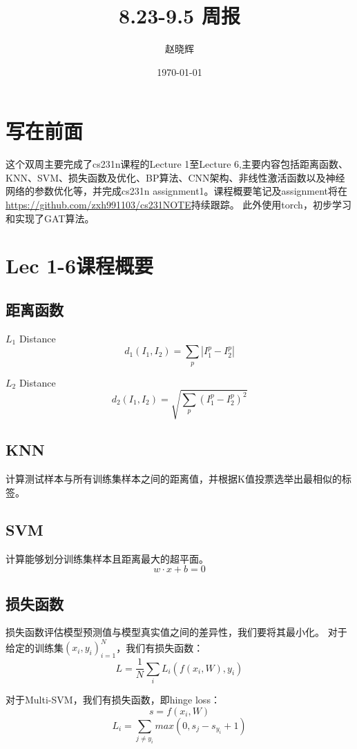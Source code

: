 \documentclass[a4paper]{article}
\title{8.23-9.5 周报}
\author{赵晓辉}
\date{\today}
\begin{document}
\maketitle

\section{写在前面}

这个双周主要完成了cs231n课程的Lecture 1至Lecture 6,主要内容包括距离函数、KNN、SVM、损失函数及优化、BP算法、CNN架构、非线性激活函数以及神经网络的参数优化等，并完成cs231n assignment1。课程概要笔记及assignment将在\url{https://github.com/zxh991103/cs231NOTE}持续跟踪。
此外使用torch，初步学习和实现了GAT算法。




\section{Lec 1-6课程概要}
\subsection{距离函数}

$L_1$ Distance
$$d_1(I_1,I_2)=\sum_p|I^p_1-I^p_2|$$

$L_2$ Distance
$$d_2(I_1,I_2) = \sqrt{\sum_p(I^p_1-I^p_2)^2}$$

\subsection{KNN}

计算测试样本与所有训练集样本之间的距离值，并根据K值投票选举出最相似的标签。

\subsection{SVM}

计算能够划分训练集样本且距离最大的超平面。
$$w\cdot x + b=0$$

\subsection{损失函数}
损失函数评估模型预测值与模型真实值之间的差异性，我们要将其最小化。
对于给定的训练集${(x_i,y_i)}^N_{i=1}$，我们有损失函数：
$$L =\frac{1}{N} \sum_i L_i(f(x_i,W),y_i)$$

对于Multi-SVM，我们有损失函数，即hinge loss：
$$s=f(x_i,W)$$
$$L_i=\sum_{j\neq y_i}max(0,s_j-s_{y_i}+1)$$
\end{document}
